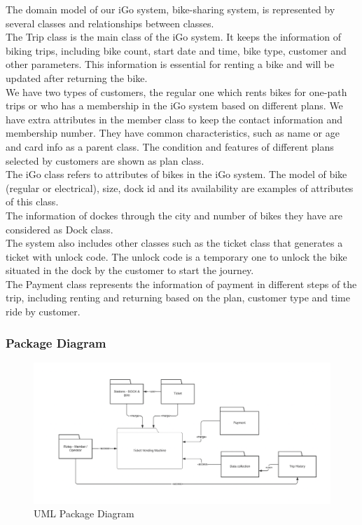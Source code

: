 The domain model of our iGo system, bike-sharing system, is represented by several classes and relationships between classes.\\

The Trip class is the main class of the iGo system. It keeps the information of biking trips, including bike count, start date and time, bike type, customer and other parameters. This information is essential for renting a bike and will be updated after returning the bike.\\

We have two types of customers, the regular one which rents bikes for one-path trips or who has a membership in the iGo system based on different plans. We have extra attributes in the member class to keep the contact information and membership number. They have common characteristics, such as name or age and card info as a parent class. The condition and features of different plans selected by customers are shown as plan class.\\

The iGo class refers to attributes of bikes in the iGo system. The model of bike (regular or electrical), size, dock id and its availability are examples of attributes of this class.\\

The information of dockes through the city and number of bikes they have are considered as Dock class.\\

The system also includes other classes such as the ticket class that generates a ticket with unlock code. The unlock code is a temporary one to unlock the bike situated in the dock by the customer to start the journey.\\

The Payment class represents the information of payment in different steps of the trip, including renting and returning based on the plan, customer type and time ride by customer.\\
\subsubsection{Package Diagram}

\begin{figure}[H]
    \centering
    \includegraphics[scale=0.40]{images/UMLPackageDiagram.png}
    \caption{UML Package Diagram}
\end{figure}

